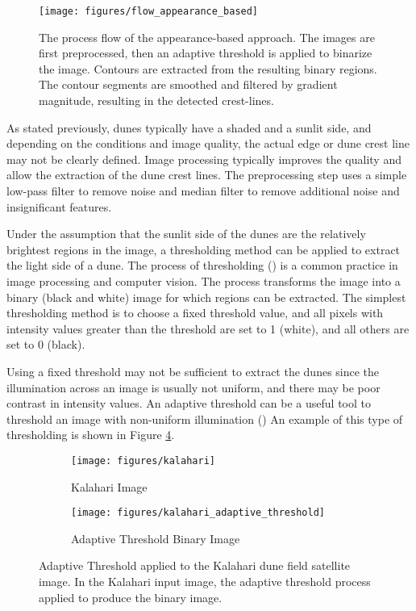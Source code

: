  \begin{figure}[H]
 	\centering
 	\texttt{[image: figures/flow\_appearance\_based]}
 	\caption{The process flow of the appearance-based approach. The images are first preprocessed, then an adaptive threshold is applied to binarize the image. Contours are extracted from the resulting binary regions. The contour segments are smoothed and filtered by gradient magnitude, resulting in the detected crest-lines.}
 	\label{fig:flow_appearance_based}
 \end{figure}

As stated previously, dunes typically have a shaded and a sunlit side, and depending on the conditions and image quality, the actual edge or dune crest line may not be clearly defined. Image processing typically improves the quality and allow the extraction of the dune crest lines. The preprocessing step uses a simple low-pass filter to remove noise and median filter to remove additional noise and insignificant features.

Under the assumption that the sunlit side of the dunes are the relatively brightest regions in the image, a thresholding method can be applied to extract the light side of a dune. The process of thresholding (\cite{digital_image_processing_book}) is a common practice in image processing and computer vision. The process transforms the image into a binary (black and white) image for which regions can be extracted. The simplest thresholding method is to choose a fixed threshold value, and all pixels with intensity values greater than the threshold are set to 1 (white), and all others are set to 0 (black).

Using a fixed threshold may not be sufficient to extract the dunes since the illumination across an image is usually not uniform, and there may be poor contrast in intensity values. An adaptive threshold can be a useful tool to threshold an image with non-uniform illumination (\cite{1990_comparative_performance_study_thresholding,1979_threshold_selection_method_gray_level_histogram,2004_survey_over_image_thresholding_techniques}) An example of this type of thresholding is shown in Figure \ref{fig:adaptive_threshold}. 

\begin{figure}
	\centering
	\begin{subfigure}{0.48\textwidth}
		\centering
		\texttt{[image: figures/kalahari]}
		\caption{Kalahari Image}
		\label{fig:kalahari_adaptive_threshold_input}
	\end{subfigure}
	\begin{subfigure}{0.48\textwidth}
		\centering
		\texttt{[image: figures/kalahari\_adaptive\_threshold]}
		\caption{Adaptive Threshold Binary Image}
		\label{fig:kalahari_adaptive_threshold}
	\end{subfigure}
	\caption{Adaptive Threshold applied to the Kalahari dune field satellite image. In  the Kalahari input image,  the adaptive threshold process applied to produce the binary image. }
	\label{fig:adaptive_threshold}
\end{figure}

